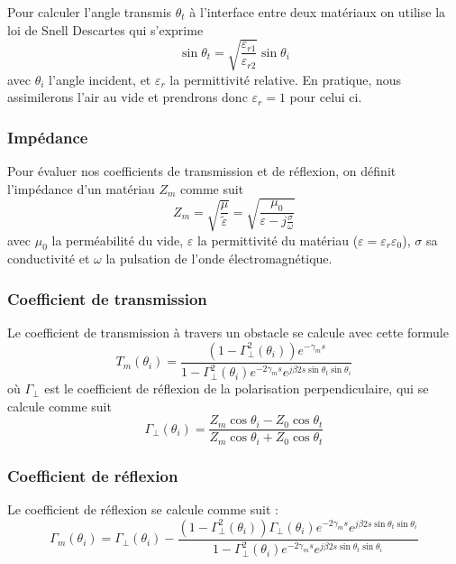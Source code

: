 Pour calculer l'angle transmis $\theta_t$ {\`a} l'interface entre deux
mat{\'e}riaux on utilise la loi de Snell Descartes qui s'exprime
\[ \sin \theta_t = \sqrt{\frac{\varepsilon_{r 1}}{\varepsilon_{r 2}}} \sin \theta_i
\]
avec $\theta_i$ l'angle incident, et $\varepsilon_r$ la permittivit{\'e}
relative. En pratique, nous assimilerons l'air au vide et prendrons donc
$\varepsilon_r = 1$ pour celui ci.

\subsubsection*{Imp{\'e}dance}

Pour {\'e}valuer nos coefficients de transmission et de r{\'e}flexion, on
d{\'e}finit l'imp{\'e}dance d'un mat{\'e}riau $Z_m$ comme suit
\[ Z_m = \sqrt{\frac{\mu}{\tilde{\varepsilon}}} = \sqrt{\frac{\mu_0}{\varepsilon - j
   \frac{\sigma}{\omega}}} \]
avec $\mu_0$ la perm{\'e}abilit{\'e} du vide, $\varepsilon$ la permittivit{\'e}
du mat{\'e}riau ($\varepsilon=\varepsilon_r\varepsilon_0$), $\sigma$ sa conductivit{\'e} et $\omega$ la pulsation de
l'onde {\'e}lectromagn{\'e}tique.

\subsubsection*{Coefficient de transmission}

Le coefficient de transmission {\`a} travers un obstacle se calcule avec cette
formule
\[ T_m (\theta_i) = \frac{(1 - \Gamma_{\perp}^2 (\theta_i)) e^{- \gamma_m
   s}}{1 - \Gamma_{\perp}^2 (\theta_i) e^{- 2 \gamma_m s} e^{j \beta 2 s \sin
   \theta_t \sin \theta_i}} \]
o{\`u} $\Gamma_{\perp}$ est le coefficient de r{\'e}flexion de la polarisation
perpendiculaire, qui se calcule comme suit
\[ \Gamma_{\perp} (\theta_i) = \frac{Z_m \cos \theta_i - Z_0 \cos
   \theta_t}{Z_m \cos \theta_i + Z_0 \cos \theta_t} \]

\subsubsection*{Coefficient de r{\'e}flexion}

Le coefficient de r{\'e}flexion se calcule comme suit :
\[ \Gamma_m (\theta_i) = \Gamma_{\perp} (\theta_i) - \frac{(1 -
   \Gamma_{\perp}^2 (\theta_i)) \Gamma_{\perp} (\theta_i) e^{- 2 \gamma_m s}
   e^{j \beta 2 s \sin \theta_t \sin \theta_i}}{1 - \Gamma_{\perp}^2
   (\theta_i) e^{- 2 \gamma_m s} e^{j \beta 2 s \sin \theta_t \sin \theta_i}}
\]


